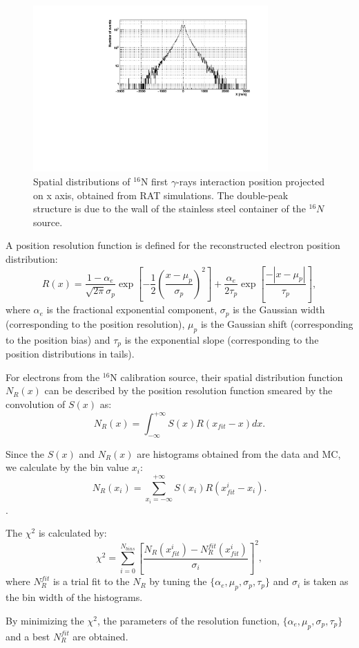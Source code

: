 \begin{figure}[!htb]
	\centering
	\includegraphics[width=9cm]{sx.pdf}
	\caption{Spatial distributions of {$^{16}$}N first $\gamma$-rays interaction position projected on x axis, obtained from RAT simulations. The double-peak structure is due to the wall of the stainless steel container of the $^{16}N$ source.}
	\label{hsx}
\end{figure}

A position resolution function is defined for the reconstructed electron position distribution\cite{boulay2004direct}:
\[
R(x)=\frac{1-\alpha_e}{\sqrt{2\pi}\sigma_p}\exp{[-\frac{1}{2}(\frac{x-\mu_p}{\sigma_p})^2]+\frac{\alpha_e}{2\tau_p}\exp{[\frac{-|x-\mu_p|}{\tau_p}]}},
\]
where $\alpha_e$ is the fractional exponential component, $\sigma_p$ is
the Gaussian width (corresponding to the position resolution), $\mu_p$ is the Gaussian shift  (corresponding to the position bias) and $\tau_p$ is the exponential slope (corresponding to the position distributions in tails).

For electrons from the $^{16}$N calibration source, their spatial distribution function $N_{R}(x)$ can be described by the position resolution function smeared by the convolution of $S(x)$ as\cite{boulay2004direct}:
\[
N_{R}(x)=\int^{+\infty}_{-\infty} S(x)R(x_{fit}-x)dx.
\]

Since the $S(x)$ and $N_{R}(x)$ are histograms obtained from the data and MC, we calculate by the bin value $x_i$: 
\[N_R(x_i)=\sum_{x_i=-\infty}^{+\infty}S(x_i)R(x_{fit}^i-x_i).\].

The $\chi^2$ is calculated by:
\[
\chi^2=\sum^{N_{bins}}_{i=0}[\frac{N_R(x_{fit}^i)-N_R^{fit}(x_{fit}^i)}{\sigma_i}]^2,
\]
where $N_R^{fit}$ is a trial fit to the $N_R$ by tuning the $\{\alpha_e,\mu_p,\sigma_p,\tau_p\}$ and $\sigma_i$ is taken as the bin width of the histograms.

By minimizing the $\chi^2$, the parameters of the resolution function, $\{\alpha_e,\mu_p,\sigma_p,\tau_p\}$ and a best $N_R^{fit}$ are obtained.

